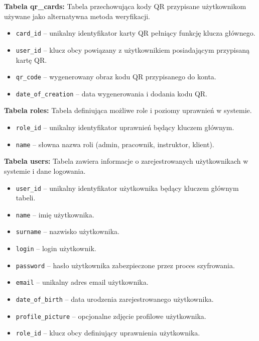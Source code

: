 \noindent\textbf{Tabela qr\_cards:} Tabela przechowująca kody QR przypisane użytkownikom używane jako alternatywna metoda weryfikacji.
\begin{itemize}[noitemsep, topsep=0pt]
    \item \texttt{card\_id} -- unikalny identyfikator karty QR pełniący funkcję klucza głównego.
    \item \texttt{user\_id} -- klucz obcy powiązany z użytkownikiem posiadającym przypisaną kartę QR.
    \item \texttt{qr\_code} -- wygenerowany obraz kodu QR przypisanego do konta.
    \item \texttt{date\_of\_creation} -- data wygenerowania i dodania kodu QR.
\end{itemize}

\noindent\textbf{Tabela roles:} Tabela definiująca możliwe role i poziomy uprawnień w systemie.
\begin{itemize}[noitemsep, topsep=0pt]
    \item \texttt{role\_id} -- unikalny identyfikator uprawnień będący kluczem głównym.
    \item \texttt{name} -- słowna nazwa roli (admin, pracownik, instruktor, klient).
\end{itemize}

\noindent\textbf{Tabela users:} Tabela zawiera informacje o zarejestrowanych użytkownikach w systemie i dane logowania.
\begin{itemize}[noitemsep, topsep=0pt]
    \item \texttt{user\_id} -- unikalny identyfikator użytkownika będący kluczem głównym tabeli.
    \item \texttt{name} -- imię użytkownika.
    \item \texttt{surname} -- nazwisko użytkownika.
    \item \texttt{login} -- login użytkownik.
    \item \texttt{password} -- hasło użytkownika zabezpieczone przez proces szyfrowania.
    \item \texttt{email} -- unikalny adres email użytkownika.
    \item \texttt{date\_of\_birth} -- data urodzenia zarejestrowanego użytkownika.
    \item \texttt{profile\_picture} -- opcjonalne zdjęcie profilowe użytkownika.
    \item \texttt{role\_id} -- klucz obcy definiujący uprawnienia użytkownika.
\end{itemize}

